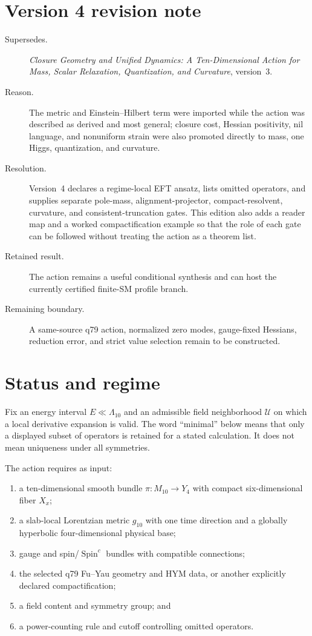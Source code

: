 \documentclass[11pt]{article}
\begin{document}
\section*{Version 4 revision note}
\begin{description}
\item[Supersedes.] \emph{Closure Geometry and Unified Dynamics: A
Ten-Dimensional Action for Mass, Scalar Relaxation, Quantization, and
Curvature}, version~3.
\item[Reason.] The metric and Einstein--Hilbert term were imported while the
action was described as derived and most general; closure cost, Hessian
positivity, nil language, and nonuniform strain were also promoted directly to
mass, one Higgs, quantization, and curvature.
\item[Resolution.] Version~4 declares a regime-local EFT ansatz, lists omitted
operators, and supplies separate pole-mass, alignment-projector,
compact-resolvent, curvature, and consistent-truncation gates.  This edition
also adds a reader map and a worked compactification example so that the role
of each gate can be followed without treating the action as a theorem list.
\item[Retained result.] The action remains a useful conditional synthesis and
can host the currently certified finite-SM profile branch.
\item[Remaining boundary.] A same-source q79 action, normalized zero modes,
gauge-fixed Hessians, reduction error, and strict value selection remain to be
constructed.
\end{description}

\tableofcontents

\section{Status and regime}

Fix an energy interval $E\ll\Lambda_{10}$ and an admissible field neighborhood
$\mathcal U$ on which a local derivative expansion is valid.  The word
``minimal'' below means that only a displayed subset of operators is retained
for a stated calculation.  It does not mean uniqueness under all symmetries.

The action requires as input:
\begin{enumerate}
\item a ten-dimensional smooth bundle
$\pi:M_{10}\to Y_4$ with compact six-dimensional fiber $X_x$;
\item a slab-local Lorentzian metric $g_{10}$ with one time direction and a
globally hyperbolic four-dimensional physical base;
\item gauge and spin/$\operatorname{Spin}^c$ bundles with compatible
connections;
\item the selected q79 Fu--Yau geometry and HYM data, or another explicitly
declared compactification;
\item a field content and symmetry group; and
\item a power-counting rule and cutoff controlling omitted operators.
\end{enumerate}
\end{document}

